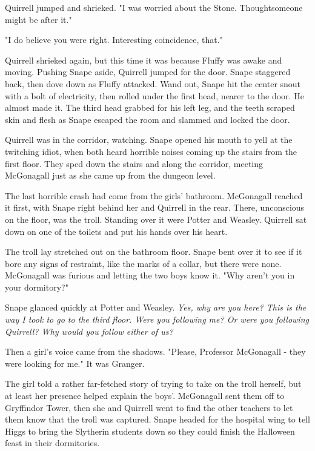 Quirrell jumped and shrieked. "I{\el} was{\el} worried about the{\el} Stone. Thought{\el}someone might be{\el} after it."

"I do believe you were right. Interesting coincidence, that."

Quirrell shrieked again, but this time it was because Fluffy was awake and moving. Pushing Snape aside, Quirrell jumped for the door. Snape staggered back, then dove down as Fluffy attacked. Wand out, Snape hit the center snout with a bolt of electricity, then rolled under the first head, nearer to the door. He almost made it. The third head grabbed for his left leg, and the teeth scraped skin and flesh as Snape escaped the room and slammed and locked the door.

Quirrell was in the corridor, watching. Snape opened his mouth to yell at the twitching idiot, when both heard horrible noises coming up the stairs from the first floor. They sped down the stairs and along the corridor, meeting McGonagall just as she came up from the dungeon level.

The last horrible crash had come from the girls' bathroom. McGonagall reached it first, with Snape right behind her and Quirrell in the rear. There, unconscious on the floor, was the troll. Standing over it were Potter and Weasley. Quirrell sat down on one of the toilets and put his hands over his heart.

The troll lay stretched out on the bathroom floor. Snape bent over it to see if it bore any signs of restraint, like the marks of a collar, but there were none. McGonagall was furious and letting the two boys know it. "{\el}Why aren't you in your dormitory?"

Snape glanced quickly at Potter and Weasley. \emph{Yes, why are you here? This is the way I took to go to the third floor. Were you following me? Or were you following Quirrell? Why would you follow either of us?}

Then a girl's voice came from the shadows. "Please, Professor McGonagall - they were looking for me." It was Granger.

The girl told a rather far-fetched story of trying to take on the troll herself, but at least her presence helped explain the boys'. McGonagall sent them off to Gryffindor Tower, then she and Quirrell went to find the other teachers to let them know that the troll was captured. Snape headed for the hospital wing to tell Higgs to bring the Slytherin students down so they could finish the Halloween feast in their dormitories.

